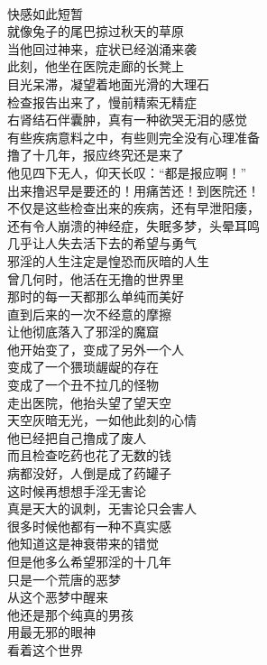 \begin{poem}[撸没一生]
    \begin{multicols}{2}
        \begin{center}~\\
            快感如此短暂 \\ 就像兔子的尾巴掠过秋天的草原 \\ 当他回过神来，症状已经汹涌来袭 \\ 此刻，他坐在医院走廊的长凳上 \\ 目光呆滞，凝望着地面光滑的大理石 \\ 检查报告出来了，慢前精索无精症 \\ 右肾结石伴囊肿，真有一种欲哭无泪的感觉 \\ 有些疾病意料之中，有些则完全没有心理准备 \\ 撸了十几年，报应终究还是来了 \\ 他见四下无人，仰天长叹：“都是报应啊！” \\ 出来撸迟早是要还的！用痛苦还！到医院还！ \\ 不仅是这些检查出来的疾病，还有早泄阳痿， \\ 还有令人崩溃的神经症，失眠多梦，头晕耳鸣 \\ 几乎让人失去活下去的希望与勇气 \\ 邪淫的人生注定是惶恐而灰暗的人生 \\ 曾几何时，他活在无撸的世界里 \\ 那时的每一天都那么单纯而美好 \\ 直到后来的一次不经意的摩擦 \\ 让他彻底落入了邪淫的魔窟 \\ 他开始变了，变成了另外一个人 \\ 变成了一个猥琐龌龊的存在 \\ 变成了一个丑不拉几的怪物 \\ 走出医院，他抬头望了望天空 \\ 天空灰暗无光，一如他此刻的心情 \\ 他已经把自己撸成了废人 \\ 而且检查吃药也花了无数的钱 \\ 病都没好，人倒是成了药罐子 \\ 这时候再想想手淫无害论 \\ 真是天大的讽刺，无害论只会害人 \\ 很多时候他都有一种不真实感 \\ 他知道这是神衰带来的错觉 \\ 但是他多么希望邪淫的十几年 \\ 只是一个荒唐的恶梦 \\ 从这个恶梦中醒来 \\ 他还是那个纯真的男孩 \\ 用最无邪的眼神 \\ 看着这个世界
        \end{center}
    \end{multicols}
\end{poem}

